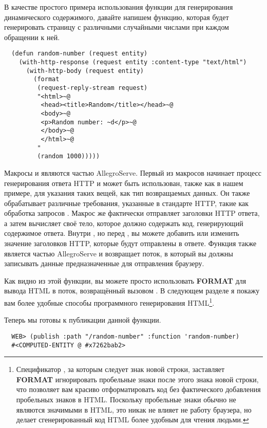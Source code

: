 В качестве простого примера использования функции для генерирования динамического
содержимого, давайте напишем функцию, которая будет генерировать страницу с различными
случайными числами при каждом обращении к ней.

\begin{lstlisting}
  (defun random-number (request entity)
    (with-http-response (request entity :content-type "text/html")
      (with-http-body (request entity)
        (format 
         (request-reply-stream request)
         "<html>~@
          <head><title>Random</title></head>~@
          <body>~@
          <p>Random number: ~d</p>~@
          </body>~@
          </html>~@
         "
         (random 1000)))))
\end{lstlisting}

Макросы  и  являются частью
AllegroServe. Первый из макросов начинает процесс генерирования ответа HTTP и может быть
использован, также как в нашем примере, для указания таких вещей, как тип возвращаемых
данных. Он также обрабатывает различные требования, указанные в стандарте HTTP, такие как
обработка запросов . Макрос же  фактически
отправляет заголовки HTTP ответа, а затем вычисляет своё тело, которое должно содержать
код, генерирующий содержимое ответа. Внутри , но перед
, вы можете добавить или изменить значение заголовков HTTP, которые
будут отправлены в ответе. Функция  также является частью
AllegroServe и возвращает поток, в который вы должны записывать данные предназначенные для
отправления браузеру.

Как видно из этой функции, вы можете просто использовать \textbf{FORMAT} для вывода HTML в
поток, возвращённый вызовом . В следующем разделе я покажу вам
более удобные способы программного генерирования HTML\footnote{Спецификатор , за
  которым следует знак новой строки, заставляет \textbf{FORMAT} игнорировать пробельные
  знаки после этого знака новой строки, что позволяет вам красиво отформатировать код без
  фактического добавления пробельных знаков в HTML. Поскольку пробельные знаки обычно не
  являются значимыми в HTML, это никак не влияет не работу браузера, но делает
  сгенерированный код HTML более удобным для чтения людьми.}.

Теперь мы готовы к публикации данной функции.

\begin{lstlisting}
  WEB> (publish :path "/random-number" :function 'random-number)
  #<COMPUTED-ENTITY @ #x7262bab2>
\end{lstlisting}

